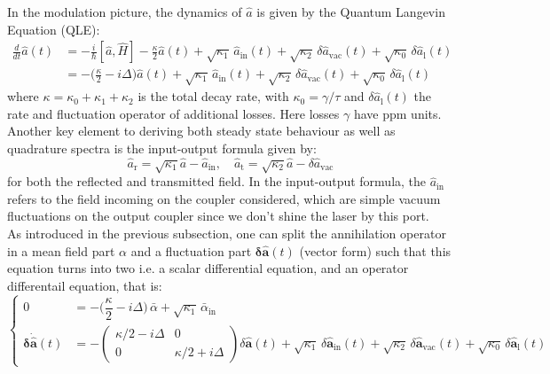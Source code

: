  
 In the modulation picture, the dynamics of \(\hat{a}\) is given by the Quantum Langevin Equation (QLE):
%
\begin{equation}
\begin{split}
  \frac{d}{dt} \hat{a}(t) & = -\frac{i}{\hbar} [\hat{a}, \hat{H}] - \frac{\kappa}{2} \hat{a}(t) + \sqrt{\kappa_1} \, \hat{a}_{\mathrm{in}}(t)  + \sqrt{\kappa_2} \, \delta \hat{a}_{\mathrm{vac}}(t) + \sqrt{\kappa_0} \, \delta \hat{a}_{\mathrm{l}}(t) \\
  & = -\Big(\frac{\kappa}{2}-i\Delta\Big) \hat{a}(t) + \sqrt{\kappa_{\mathrm{1}}} \, \hat{a}_{\mathrm{in}}(t)  + \sqrt{\kappa_2} \, \delta \hat{a}_{\mathrm{vac}}(t)  + \sqrt{\kappa_0} \, \delta \hat{a}_{\mathrm{l}}(t) 
\label{eq:qle}
\end{split}
\end{equation}
where  \(\kappa = \kappa_0 + \kappa_1 + \kappa_2\) is the total decay rate, with $\kappa_0=\gamma/\tau$ and $ \delta \hat{a}_{\mathrm{l}}(t)$ the rate and fluctuation operator of additional losses. Here losses $\gamma$ have ppm units. Another key element to deriving both steady state behaviour as well as quadrature spectra is the input-output formula given by:
\begin{equation}
  \hat{a}_{\mathrm{r}} = \sqrt{\kappa_{1}}\hat{a} - \hat{a}_{\mathrm{in}} , \quad \hat{a}_{\mathrm{t}} = \sqrt{\kappa_{2}}\hat{a} - \delta \hat{a}_{\mathrm{vac}} 
\end{equation}
for both the reflected and transmitted field. In the input-output formula, the $\hat{a}_{\mathrm{in}}$ refers to the field incoming on the coupler considered, which are simple vacuum fluctuations on the output coupler since we don't shine the laser by this port.\\

As introduced in the previous subsection, one can split the annihilation operator in a mean field part $\alpha$ and a fluctuation part $\mathbf{\delta \hat{a}}(t)$ (vector form) such that this equation turns into two i.e. a scalar differential equation, and an operator differentail equation, that is:
\begin{equation}
\left\{
\begin{aligned}
0 &= -\Big(\dfrac{\kappa}{2}-i\Delta\Big)\,\bar{\alpha}
    + \sqrt{\kappa_1}\,\bar{\alpha}_{\mathrm{in}} \\
 \mathbf{\delta \dot{\hat{a}}}(t)&
  = -\begin{pmatrix}
        \kappa/2-i\Delta & 0 \\
        0 & \kappa/2+i\Delta
      \end{pmatrix}\!
      \delta\hat{\mathbf{a}}(t)
     + \sqrt{\kappa_1}\,\delta\hat{\mathbf{a}}_{\mathrm{in}}(t)
     + \sqrt{\kappa_2}\,\delta\hat{\mathbf{a}}_{\mathrm{vac}}(t)
     + \sqrt{\kappa_0}\,\delta\hat{\mathbf{a}}_{\mathrm{l}}(t)
\end{aligned}
\right.
\tag{II.62}
\end{equation}

